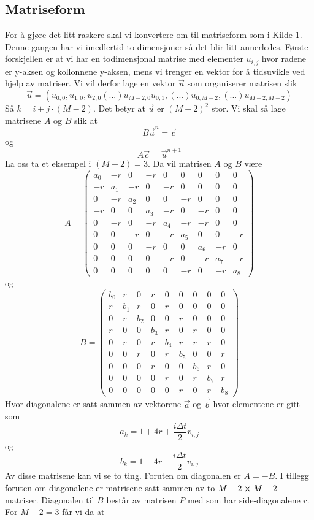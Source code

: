 \documentclass[reprint,english,notitlepage]{revtex4-2}  %
\begin{document}
\subsection{Matriseform}
For å gjøre det litt raskere skal vi konvertere om til matriseform som i Kilde 1. Denne gangen har vi imedlertid to dimensjoner så det blir litt annerledes. Første forskjellen er at vi har en todimensjonal matrise med elementer $u_{i,j}$ hvor radene er y-aksen og kollonnene y-aksen, mens vi trenger en vektor for å tidsuvikle ved hjelp av matriser. Vi vil derfor lage en vektor $\vec{u}$ som organiserer matrisen slik
$$
\vec{u}=(u_{0,0}, u_{1,0}, u_{2,0} (...) u_{M-2, 0} u_{0,1},(...) u_{0, M-2}, (...) u_{M-2, M-2})
$$
Så $k=i+j\cdot (M-2)$. Det betyr at $\vec{u}$ er $(M-2)^2$ stor.
\newline 
Vi skal så lage matrisene $A$ og $B$ slik at
$$
B\vec{u}^n=\vec{c}
$$
og
$$
A\vec{c}=\vec{u}^{n+1}
$$
La oss ta et eksempel i $(M-2)=3$. Da vil matrisen $A$ og $B$ være
$$
A=\begin{pmatrix}
	a_0 & -r & 0 & -r & 0 &0&0&0&0 \\
	-r & a_1 & -r & 0 & -r& 0&0&0&0 \\
	0 &-r &a_2&0&0&-r&0&0&0 \\
	-r &0&0&a_3&-r&0&-r&0&0 \\
	0&-r&0&-r&a_4&-r&-r&0&0 \\
	0&0&-r&0&-r&a_5&0&0&-r \\
	0&0&0&-r&0&0&a_6&-r&0 \\
	0&0&0&0&-r&0&-r&a_7&-r \\
	0&0&0&0&0&-r&0&-r&a_8
\end{pmatrix}
$$
og
$$
B=\begin{pmatrix}
	b_0 & r & 0 & r & 0 &0&0&0&0 \\
	r & b_1 & r & 0 & r& 0&0&0&0 \\
	0 &r &b_2&0&0&r&0&0&0 \\
	r &0&0&b_3&r&0&r&0&0 \\
	0&r&0&r&b_4&r&r&r&0 \\
	0&0&r&0&r&b_5&0&0&r \\
	0&0&0&r&0&0&b_6&r&0 \\
	0&0&0&0&r&0&r&b_7&r \\
	0&0&0&0&0&r&0&r&b_8
\end{pmatrix}
$$
Hvor diagonalene er satt sammen av vektorene $\vec{a}$ og $\vec{b}$ hvor elementene er gitt som
$$
a_k=1+4r+\frac{i\Delta t}{2}v_{i,j}
$$
og
$$
b_k=1-4r-\frac{i\Delta t}{2}v_{i,j}
$$
Av disse matrisene kan vi se to ting. Foruten om diagonalen er $A=-B$. I tillegg foruten om diagonalene er matrisene satt sammen av to $M-2 \cross M-2$ matriser. Diagonalen til $B$ består av matrisen $P$ med som har side-diagonalene $r$. For $M-2=3$ får vi da at
\end{document}
